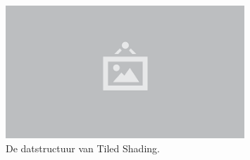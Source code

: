 \begin{figure}
  \centering
  \includegraphics[width=0.8\textwidth]{./img/raw/placeholder.png}
  \caption{De datstructuur van Tiled Shading.}
  \label{fig:ts-datastructuur}
\end{figure}
